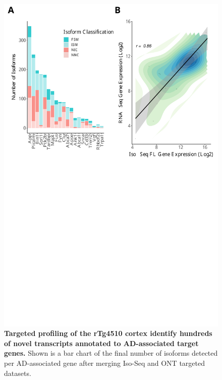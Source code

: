 \newpage
{}
\begin{figure}[]
	\centering
	\includegraphics[page=8,trim={0 26cm 0 0cm},clip,scale = 0.55]{Figures/ONTvsIsoSeq.pdf}
	\captionsetup{width=0.95\textwidth}
	\caption[Merged isoform landscape from Iso-Seq \& ONT targeted profiling]%
	{\textbf{Targeted profiling of the rTg4510 cortex identify hundreds of novel transcripts annotated to AD-associated target genes.} Shown is a bar chart of the final number of isoforms detected per AD-associated gene after merging Iso-Seq and ONT targeted datasets.}
	\label{fig:final_targeted_num}
\end{figure}

